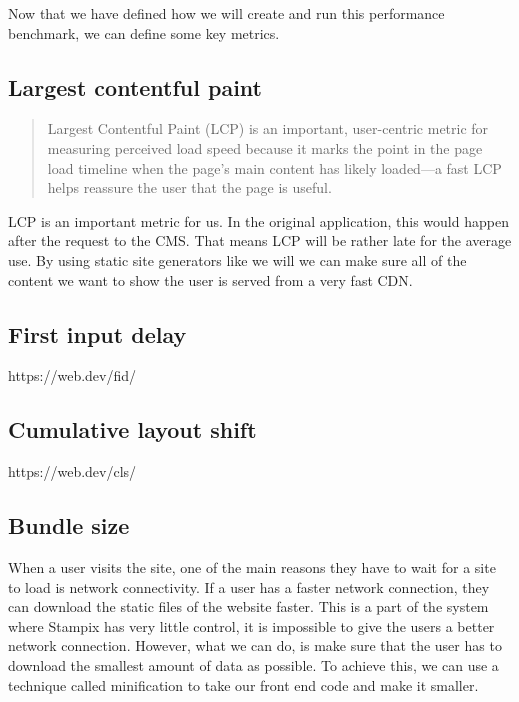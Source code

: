 Now that we have defined how we will create and run this performance benchmark, we can define some key metrics.

\subsection{Largest contentful paint}

\begin{quote}
	Largest Contentful Paint (LCP) is an important, user-centric metric for measuring perceived load speed because it marks the point in the page load timeline when the page's main content has likely loaded—a fast LCP helps reassure the user that the page is useful.
	\hfill \cite{webvitalswebsite}
\end{quote}

LCP is an important metric for us. In the original application, this would happen after the request to the CMS. 
That means LCP will be rather late for the average use. 
By using static site generators like we will we can make sure all of the content we want to show the user is served from a very fast CDN.

\subsection{First input delay}

https://web.dev/fid/

\subsection{Cumulative layout shift}

https://web.dev/cls/


\subsection{Bundle size}

When a user visits the site, one of the main reasons they have to wait for a site to load is network connectivity. 
If a user has a faster network connection, they can download the static files of the website faster.
This is a part of the system where Stampix has very little control, it is impossible to give the users a better network connection. 
However, what we can do, is make sure that the user has to download the smallest amount of data as possible. 
To achieve this, we can use a technique called minification to take our front end code and make it smaller.

